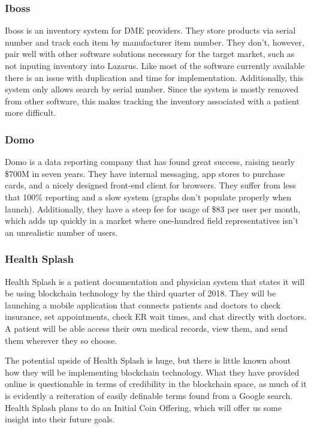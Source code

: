 \documentclass[12pt]{article}
\begin{document}
    \subsubsection{Iboss}
    Iboss is an inventory system for DME providers. They store products via serial number and track each item by manufacturer item number. They don’t, however, pair well with other software solutions necessary for the target market, such as not inputing inventory into Lazarus. Like most of the software currently available there is an issue with duplication and time for implementation. Additionally, this system only allows search by serial number. Since the system is mostly removed from other software, this makes tracking the inventory associated with a patient more difficult.

    \subsubsection{Domo}
    Domo is a data reporting company that has found great success, raising nearly \$700M in seven years. They have internal messaging, app stores to purchase cards, and a nicely designed front-end client for browsers. They suffer from less that 100\% reporting and a slow system (graphs don’t populate properly when launch). Additionally, they have a steep fee for usage of \$83 per user per month, which adds up quickly in a market where one-hundred field representatives isn’t an unrealistic number of users.

    \subsubsection{Health Splash}
    Health Splash is a patient documentation and physician system that states it will be using blockchain technology by the third quarter of 2018. They will be launching a mobile application that connects patients and doctors to check insurance, set appointments, check ER wait times, and chat directly with doctors. A patient will be able access their own medical records, view them, and send them wherever they so choose.

    The potential upside of Health Splash is huge, but there is little known about how they will be implementing blockchain technology. What they have provided online is questionable in terms of credibility in the blockchain space, as much of it is evidently a reiteration of easily definable terms found from a Google search. Health Splash plans to do an Initial Coin Offering, which will offer us some insight into their future goals.
\end{document}
